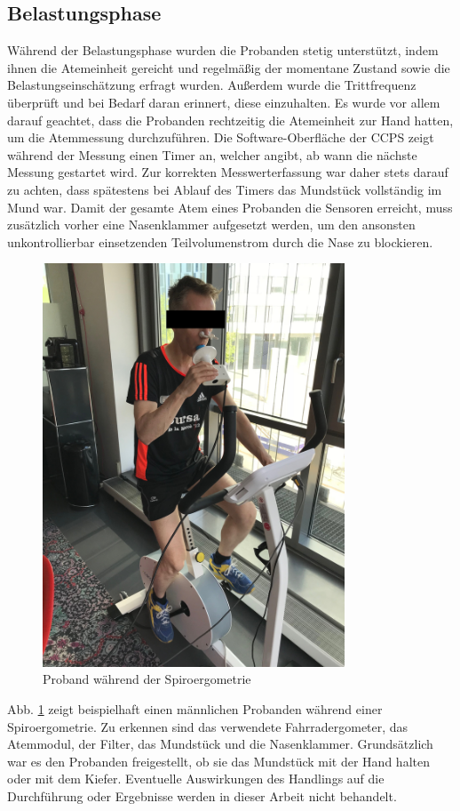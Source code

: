 \subsection{Belastungsphase}
%
Während der Belastungsphase wurden die Probanden stetig unterstützt, indem ihnen die Atemeinheit gereicht und regelmäßig der momentane Zustand sowie die Belastungseinschätzung erfragt wurden. Außerdem wurde die Trittfrequenz überprüft und bei Bedarf daran erinnert, diese einzuhalten. Es wurde vor allem darauf geachtet, dass die Probanden rechtzeitig die Atemeinheit zur Hand hatten, um die Atemmessung durchzuführen. Die Software-Oberfläche der \gls{CCPS} zeigt während der Messung einen Timer an, welcher angibt, ab wann die nächste Messung gestartet wird. Zur korrekten Messwerterfassung war daher stets darauf zu achten, dass spätestens bei Ablauf des Timers das Mundstück vollständig im Mund war. Damit der gesamte Atem eines Probanden die Sensoren erreicht, muss zusätzlich vorher eine Nasenklammer aufgesetzt werden, um den ansonsten unkontrollierbar einsetzenden Teilvolumenstrom durch die Nase zu blockieren.
%
\begin{figure}[H]
	\centering
	\includegraphics[width=90mm]{Bilder/proband.jpg}
	\caption{Proband während der Spiroergometrie}
	\label{pic:pic11}
\end{figure}
%
Abb. \ref{pic:pic11} zeigt beispielhaft einen männlichen Probanden während einer Spiroergometrie. Zu erkennen sind das verwendete Fahrradergometer, das Atemmodul, der Filter, das Mundstück und die Nasenklammer. Grundsätzlich war es den Probanden freigestellt, ob sie das Mundstück mit der Hand halten oder mit dem Kiefer. Eventuelle Auswirkungen des Handlings auf die Durchführung oder Ergebnisse werden in dieser Arbeit nicht behandelt.\\
